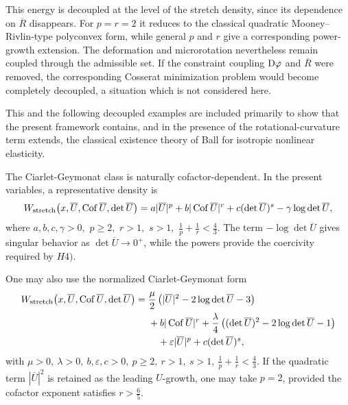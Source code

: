 \documentclass[11pt]{article}
\DeclareMathOperator{\Cof}{Cof}
\begin{document}
\begin{itemize}
 {
This energy is decoupled at the level of the stretch density, since its
dependence on $\overline R$ disappears. For $p=r=2$ it reduces to the
classical quadratic Mooney--Rivlin-type polyconvex form, while general
$p$ and $r$ give a corresponding power-growth extension. The deformation
and microrotation nevertheless remain coupled through the admissible set.
If the constraint coupling ${\rm D}\varphi$ and $\overline R$ were removed,
the corresponding Cosserat minimization problem would become completely
decoupled, a situation which is not considered here.}

 {This and the following decoupled examples are included primarily to show
that the present framework contains, and in the presence of the
rotational-curvature term extends, the classical existence theory of Ball
for isotropic nonlinear elasticity.}

The Ciarlet-Geymonat class \cite{CiarletGeymonat1982} is naturally cofactor-dependent. In the present
variables, a representative density is
\begin{align}
        W_{\rm stretch}\bigl(x,\overline U,\Cof \overline U,\det \overline U\bigr)
        =
        a | \overline U | ^p
        +
        b | \Cof \overline U | ^r
        +
        c(\det \overline U)^s
        -
        \gamma\log\det \overline U,
\end{align}
where
$
        a, b, c, \gamma>0,
            $ $
        p\geq2,
             $ $
        r>1,
             $ $
        s>1,
           $ $
        \frac1p+\frac1r<\frac43.
$
The term $-\log\det \overline U$ gives singular behavior as $\det \overline U\to0^+$, while
the powers provide the coercivity required by $H4)$.

One may also use the normalized Ciarlet-Geymonat form
\begin{align}
\begin{aligned}
        W_{\rm stretch}\bigl(x,\overline U,\Cof \overline U,\det \overline U\bigr)
        ={}&
        \frac{\mu}{2}
        \left(
         | \overline U | ^2
        -
        2\log\det \overline U
        -
        3
        \right)
        \\
        &+
        b | \Cof \overline U | ^r
        +
        \frac{\lambda}{4}
        \left(
        (\det \overline U)^2
        -
        2\log\det \overline U
        -
        1
        \right)
        \\
        &\quad+
        \varepsilon |\overline U|^p
        +
        c(\det \overline U)^s,
\end{aligned}
\end{align}
with
$
\mu>0,\ \lambda>0,\  b,\varepsilon,c>0,
\ p\geq2,\  r>1,\  s>1,
\ \frac1p+\frac1r<\frac43 .
$
If the quadratic term $|\overline U|^2$ is retained as the leading $U$-growth, one may
take $p=2$, provided the cofactor exponent satisfies
$
        r>\frac65.
$


\end{itemize}
\end{document}
